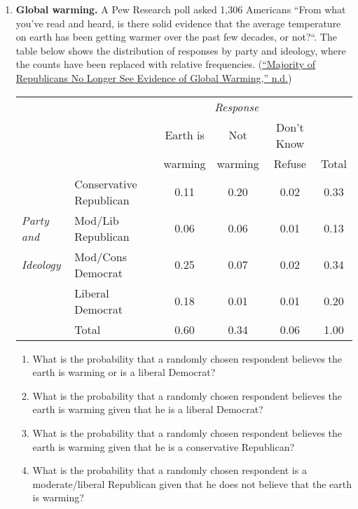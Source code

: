 \documentclass[
]{article}
\providecommand{\tightlist}{%
  \setlength{\itemsep}{0pt}\setlength{\parskip}{0pt}}
\begin{document}
\begin{enumerate}
\def\labelenumi{\arabic{enumi}.}
\item
  \textbf{Global warming.} A Pew Research poll asked 1,306 Americans ``From what you've read and heard, is there solid evidence that the average temperature on earth has been getting warmer over the past few decades, or not?{}``. The table below shows the distribution of responses by party and ideology, where the counts have been replaced with relative frequencies. (\protect\hyperlink{ref-globalWarming}{{``Majority of Republicans No Longer See Evidence of Global Warming,''} n.d.})

  \begin{center}
  \begin{tabular}{ll  ccc c} 
                      &                           & \multicolumn{3}{c}{\textit{Response}} \\
  \cline{3-5}
                      &                           & Earth is  & Not       & Don't Know    &   \\
                      &                           & warming   & warming   & Refuse        & Total\\
  \cline{2-6}
                      & Conservative Republican   & 0.11      & 0.20      & 0.02      & 0.33  \\
  \textit{Party and}  & Mod/Lib Republican        & 0.06      & 0.06      & 0.01      & 0.13 \\
  \textit{Ideology}   & Mod/Cons Democrat         & 0.25      & 0.07      & 0.02      & 0.34 \\
                      & Liberal Democrat          & 0.18      & 0.01      & 0.01      & 0.20\\
  \cline{2-6}
                      &Total                      & 0.60      & 0.34      & 0.06      & 1.00
  \end{tabular}
  \end{center}

  \begin{enumerate}
  \def\labelenumii{\alph{enumii}.}
  \tightlist
  \item
    What is the probability that a randomly chosen respondent believes the earth is warming or is a liberal Democrat?
  \item
    What is the probability that a randomly chosen respondent believes the earth is warming given that he is a liberal Democrat?
  \item
    What is the probability that a randomly chosen respondent believes the earth is warming given that he is a conservative Republican?
  \item
    What is the probability that a randomly chosen respondent is a moderate/liberal Republican given that he does not believe that the earth is warming?
  \end{enumerate}
\end{enumerate}
\end{document}
